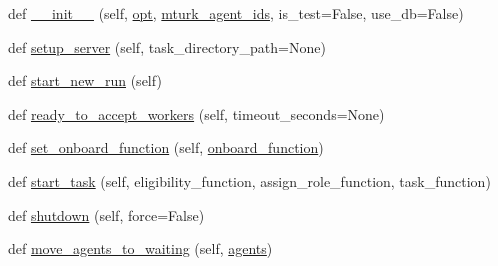 \begin{DoxyCompactItemize}
\item 
def \hyperlink{classparlai_1_1mturk_1_1webapp_1_1run__mocks_1_1mock__turk__manager_1_1MockTurkManager_ac6c394612ebb458f0ddad07f5325eb3d}{\+\_\+\+\_\+init\+\_\+\+\_\+} (self, \hyperlink{classparlai_1_1mturk_1_1webapp_1_1run__mocks_1_1mock__turk__manager_1_1MockTurkManager_aac112e5b6007f3564a3e9b259aac2e83}{opt}, \hyperlink{classparlai_1_1mturk_1_1webapp_1_1run__mocks_1_1mock__turk__manager_1_1MockTurkManager_a2226080faa905349680dbbdb69950c8f}{mturk\+\_\+agent\+\_\+ids}, is\+\_\+test=False, use\+\_\+db=False)
\item 
def \hyperlink{classparlai_1_1mturk_1_1webapp_1_1run__mocks_1_1mock__turk__manager_1_1MockTurkManager_ae2964afb8cf024568b9a4a06c83411b0}{setup\+\_\+server} (self, task\+\_\+directory\+\_\+path=None)
\item 
def \hyperlink{classparlai_1_1mturk_1_1webapp_1_1run__mocks_1_1mock__turk__manager_1_1MockTurkManager_a32f3b631a0c6cfa67bfc8a214c453bc2}{start\+\_\+new\+\_\+run} (self)
\item 
def \hyperlink{classparlai_1_1mturk_1_1webapp_1_1run__mocks_1_1mock__turk__manager_1_1MockTurkManager_aaa9ce23bc143b033706d145e16078119}{ready\+\_\+to\+\_\+accept\+\_\+workers} (self, timeout\+\_\+seconds=None)
\item 
def \hyperlink{classparlai_1_1mturk_1_1webapp_1_1run__mocks_1_1mock__turk__manager_1_1MockTurkManager_a94b983f0d3a8c8fac19bc24ff62eacbd}{set\+\_\+onboard\+\_\+function} (self, \hyperlink{classparlai_1_1mturk_1_1webapp_1_1run__mocks_1_1mock__turk__manager_1_1MockTurkManager_a10f2ca04ba1557f54eec4e04cfe92ddd}{onboard\+\_\+function})
\item 
def \hyperlink{classparlai_1_1mturk_1_1webapp_1_1run__mocks_1_1mock__turk__manager_1_1MockTurkManager_aaf3ea17684e3684dea2850c077b218e6}{start\+\_\+task} (self, eligibility\+\_\+function, assign\+\_\+role\+\_\+function, task\+\_\+function)
\item 
def \hyperlink{classparlai_1_1mturk_1_1webapp_1_1run__mocks_1_1mock__turk__manager_1_1MockTurkManager_a2aaa4c749bab8b987163b22620821dad}{shutdown} (self, force=False)
\item 
def \hyperlink{classparlai_1_1mturk_1_1webapp_1_1run__mocks_1_1mock__turk__manager_1_1MockTurkManager_a1af5d379afacc9de4841046defdcf07e}{move\+\_\+agents\+\_\+to\+\_\+waiting} (self, \hyperlink{classparlai_1_1mturk_1_1webapp_1_1run__mocks_1_1mock__turk__manager_1_1MockTurkManager_a31afd85428c9d5a26fa1863247d57a87}{agents})

\end{DoxyCompactItemize}
